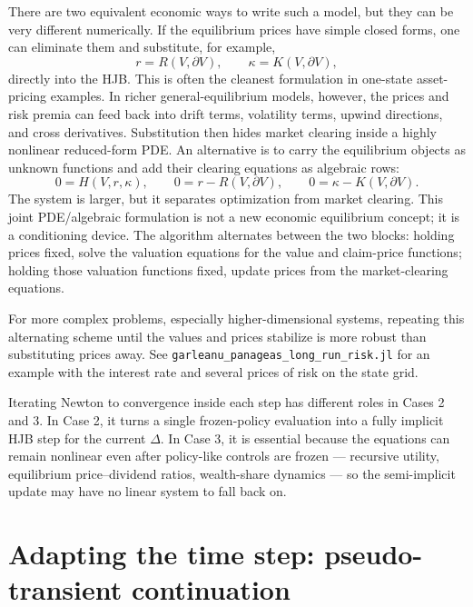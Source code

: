 \documentclass[11pt]{article}
\numberwithin{equation}{section}
\begin{document}
				There are two equivalent economic ways to write such a model, but they can be very different numerically. If the equilibrium prices have simple closed forms, one can eliminate them and substitute, for example,
		\begin{equation*}
			r = R(V,\partial V), \qquad \kappa = K(V,\partial V),
		\end{equation*}
		directly into the HJB. This is often the cleanest formulation in one-state asset-pricing examples. In richer general-equilibrium models, however, the prices and risk premia can feed back into drift terms, volatility terms, upwind directions, and cross derivatives. Substitution then hides market clearing inside a highly nonlinear reduced-form PDE. An alternative is to carry the equilibrium objects as unknown functions and add their clearing equations as algebraic rows:
		\begin{equation*}
			0 = H(V,r,\kappa), \qquad 0 = r - R(V,\partial V), \qquad 0 = \kappa - K(V,\partial V).
		\end{equation*}
		The system is larger, but it separates optimization from market clearing. This joint PDE/algebraic formulation is not a new economic equilibrium concept; it is a conditioning device. The algorithm alternates between the two blocks: holding prices fixed, solve the valuation equations for the value and claim-price functions; holding those valuation functions fixed, update prices from the market-clearing equations.

		For more complex problems, especially higher-dimensional systems, repeating this alternating scheme until the values and prices stabilize is more robust than substituting prices away. See \texttt{garleanu\_panageas\_long\_run\_risk.jl} for an example with the interest rate and several prices of risk on the state grid.

				Iterating Newton to convergence inside each step has different roles in Cases 2 and 3. In Case 2, it turns a single frozen-policy evaluation into a fully implicit HJB step for the current $\Delta$. In Case 3, it is essential because the equations can remain nonlinear even after policy-like controls are frozen --- recursive utility, equilibrium price--dividend ratios, wealth-share dynamics --- so the semi-implicit update may have no linear system to fall back on.

	\section{Adapting the time step: pseudo-transient continuation}\label{sec:ptc}
\end{document}
